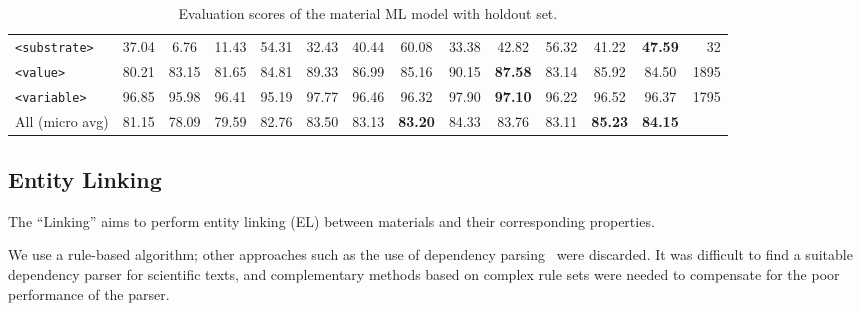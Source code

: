 \documentclass[]{interact}
\theoremstyle{plain}%
\theoremstyle{definition}
\theoremstyle{remark}
\begin{document}
\begin{table}[ht]
{\begin{tabular}{l ccc ccc ccc ccc r}
            \texttt{<substrate>}   & 37.04                            & 6.76                                      & 11.43                                              & 54.31      & 32.43      & 40.44          & 60.08          & 33.38      & 42.82          & 56.32      & 41.22          & \textbf{47.59} & 32   \\
            \texttt{<value>}       & 80.21                            & 83.15                                     & 81.65                                              & 84.81      & 89.33      & 86.99          & 85.16          & 90.15      & \textbf{87.58} & 83.14      & 85.92          & 84.50          & 1895 \\
            \texttt{<variable>}    & 96.85                            & 95.98                                     & 96.41                                              & 95.19      & 97.77      & 96.46          & 96.32          & 97.90      & \textbf{97.10} & 96.22      & 96.52          & 96.37          & 1795 \\
            \midrule
            All (micro avg)        & 81.15                            & 78.09                                     & 79.59                                              & 82.76      & 83.50      & 83.13          & \textbf{83.20} & 84.33      & 83.76          & 83.11      & \textbf{85.23} & \textbf{84.15} &      \\
            \bottomrule
        \end{tabular}
    }
    \caption{\label{tab:evaluation-10fold-material-parser} Evaluation scores of the material ML model with holdout set. }
\end{table}

\subsection{Entity Linking}
\label{subsubsec:linking}

The ``Linking'' aims to perform entity linking (EL) between materials and their corresponding properties.

We use a rule-based algorithm; other approaches such as the use of dependency parsing~\cite{yoshikawa:2017acl, Tiktinsky2020pyBARTES, swayamdipta:17, zhou-zhao-2019-head} were discarded.
It was difficult to find a suitable dependency parser for scientific texts, and complementary methods based on complex rule sets were needed to compensate for the poor performance of the parser.
\end{document}
